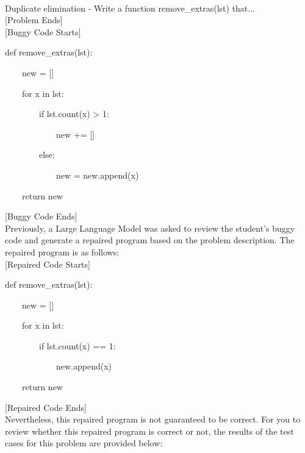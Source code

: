 \documentclass{article}
\begin{document}
\begin{figure*}[h!]
    \centering
    \begin{tcolorbox}[colframe=black!10!white, colback=black!5!white]
        \begin{minipage}{\textwidth}
            \\
            Duplicate elimination - Write a function remove\_extras(lst) that...
            \texttt{\\}
            [Problem Ends]\\
                        
            [Buggy Code Starts]

            def remove\_extras(lst):

            $\quad\quad$new = []

            $\quad\quad$for x in lst:

            $\quad\quad$$\quad\quad$if lst.count(x) > 1:

            $\quad\quad$$\quad\quad$$\quad\quad$new += []

            $\quad\quad$$\quad\quad$else:

            $\quad\quad$$\quad\quad$$\quad\quad$new = new.append(x)

            $\quad\quad$return new

            [Buggy Code Ends]\\
            
            Previously, a Large Language Model was asked to review the student's buggy code and generate a repaired program based on the problem description. The repaired program is as follows:\\
            
            [Repaired Code Starts]

            def remove\_extras(lst):

            $\quad\quad$new = []

            $\quad\quad$for x in lst:

            $\quad\quad$$\quad\quad$if lst.count(x) == 1:

            $\quad\quad$$\quad\quad$$\quad\quad$new.append(x)

            $\quad\quad$return new

            [Repaired Code Ends]\\
            
            Nevertheless, this repaired program is not guaranteed to be correct. For you to review whether this repaired program is correct or not, the results of the test cases for this problem are provided below:\\
            

\end{minipage}
\end{tcolorbox}
\end{figure*}
\end{document}
